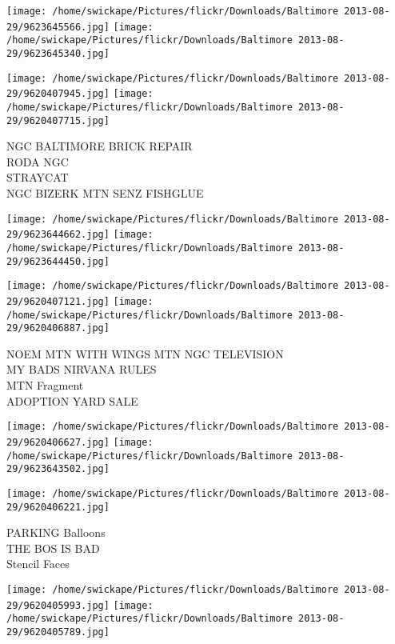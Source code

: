 \documentclass[10pt,letterpaper]{article}
\begin{document}
\texttt{[image: /home/swickape/Pictures/flickr/Downloads/Baltimore 2013-08-29/9623645566.jpg]}
\texttt{[image: /home/swickape/Pictures/flickr/Downloads/Baltimore 2013-08-29/9623645340.jpg]}

\texttt{[image: /home/swickape/Pictures/flickr/Downloads/Baltimore 2013-08-29/9620407945.jpg]}
\texttt{[image: /home/swickape/Pictures/flickr/Downloads/Baltimore 2013-08-29/9620407715.jpg]}

NGC BALTIMORE BRICK REPAIR\\
RODA NGC\\
STRAYCAT\\
NGC BIZERK MTN SENZ FISHGLUE\\
\pagebreak

\texttt{[image: /home/swickape/Pictures/flickr/Downloads/Baltimore 2013-08-29/9623644662.jpg]}
\texttt{[image: /home/swickape/Pictures/flickr/Downloads/Baltimore 2013-08-29/9623644450.jpg]}

\texttt{[image: /home/swickape/Pictures/flickr/Downloads/Baltimore 2013-08-29/9620407121.jpg]}
\texttt{[image: /home/swickape/Pictures/flickr/Downloads/Baltimore 2013-08-29/9620406887.jpg]}

NOEM MTN WITH WINGS MTN NGC TELEVISION\\
MY BADS NIRVANA RULES\\
MTN Fragment\\
ADOPTION YARD SALE\\
\pagebreak

\texttt{[image: /home/swickape/Pictures/flickr/Downloads/Baltimore 2013-08-29/9620406627.jpg]}
\texttt{[image: /home/swickape/Pictures/flickr/Downloads/Baltimore 2013-08-29/9623643502.jpg]}

\vspace{0.25in}
\texttt{[image: /home/swickape/Pictures/flickr/Downloads/Baltimore 2013-08-29/9620406221.jpg]}

PARKING Balloons\\
THE BOS IS BAD\\
Stencil Faces\\
\pagebreak

\texttt{[image: /home/swickape/Pictures/flickr/Downloads/Baltimore 2013-08-29/9620405993.jpg]}
\texttt{[image: /home/swickape/Pictures/flickr/Downloads/Baltimore 2013-08-29/9620405789.jpg]}
\end{document}
